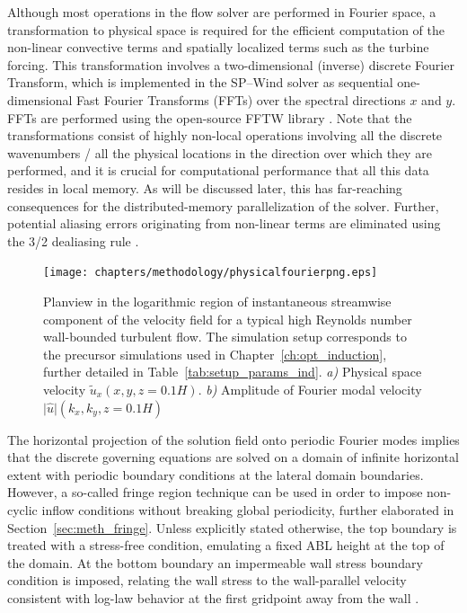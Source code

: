 Although most operations in the flow solver are performed in Fourier space, a transformation to physical space is required for the efficient computation of the non-linear convective terms and spatially localized terms such as the turbine forcing. This transformation involves a two-dimensional (inverse) discrete Fourier Transform, which is implemented in the SP--Wind solver as sequential one-dimensional Fast Fourier Transforms (FFTs) over the spectral directions $x$ and $y$. FFTs are performed using the open-source FFTW library \citep{frigo1997fastest}. Note that the transformations consist of highly non-local operations involving all the discrete wavenumbers / all the physical locations in the direction over which they are performed, and it is crucial for computational performance that all this data resides in local memory. As will be discussed later, this has far-reaching consequences for the distributed-memory parallelization of the solver. Further, potential aliasing errors originating from non-linear terms are eliminated using the 3/2 dealiasing rule \citep{canuto1988spectral}.

\begin{figure}
	\centering
	\texttt{[image: chapters/methodology/physicalfourierpng.eps]}
	\caption[Planview in the logarithmic region of instantaneous streamwise component of the velocity field for a typical high Reynolds number wall-bounded turbulent flow.]{Planview in the logarithmic region of instantaneous streamwise component of the velocity field for a typical high Reynolds number wall-bounded turbulent flow. The simulation setup corresponds to the precursor simulations used in Chapter~\ref{ch:opt_induction}, further detailed in Table~\ref{tab:setup_params_ind}. \emph{a)} Physical space velocity $\tilde{u}_x (x, y, z=0.1H)$. \emph{b)} Amplitude of Fourier modal velocity $\vert \hat{u} \vert (k_x, k_y, z=0.1H)$ \label{fig:physical_fourier}}
\end{figure}

The horizontal projection of the solution field onto periodic Fourier modes implies that the discrete governing equations are solved on a domain of infinite horizontal extent with periodic boundary conditions at the lateral domain boundaries. However, a so-called fringe region technique can be used in order to impose non-cyclic inflow conditions without breaking global periodicity, further elaborated in Section~\ref{sec:meth_fringe}. Unless explicitly stated otherwise, the top boundary is treated with a stress-free condition, emulating a fixed ABL height at the top of the domain. At the bottom boundary an impermeable wall stress boundary condition is imposed, relating the wall stress to the wall-parallel velocity consistent with log-law behavior at the first gridpoint away from the wall \citep{bou2005scale, calaf2010large}. 


